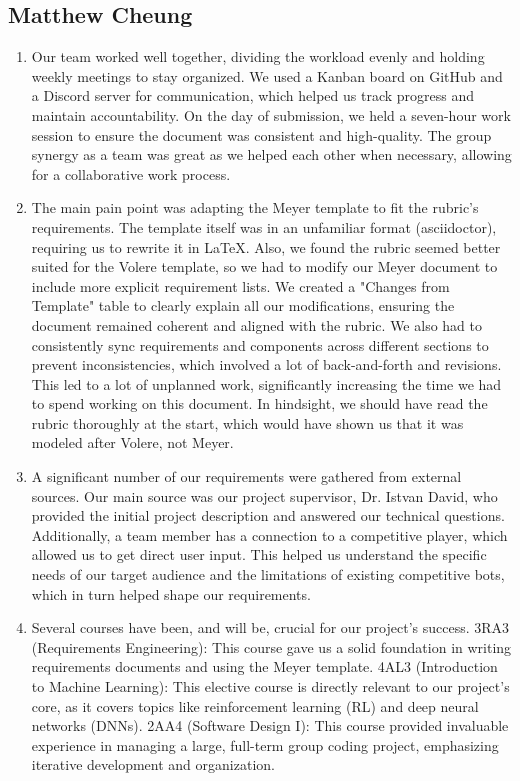 \documentclass{article}
\begin{document}
\subsection*{Matthew Cheung}\label{subsec:matthew-cheung}
\begin{enumerate}
    \item
    Our team worked well together, dividing the workload evenly and holding weekly meetings to stay organized.
    We used a Kanban board on GitHub and a Discord server for communication, which helped us track progress and maintain accountability.
    On the day of submission, we held a seven-hour work session to ensure the document was consistent and high-quality.
    The group synergy as a team was great as we helped each other when necessary, allowing for a collaborative work process.

    \item The main pain point was adapting the Meyer template to fit the rubric's requirements.
    The template itself was in an unfamiliar format (asciidoctor), requiring us to rewrite it in LaTeX.
    Also, we found the rubric seemed better suited for the Volere template, so we had to modify our Meyer document to include more explicit requirement lists.
    We created a "Changes from Template" table to clearly explain all our modifications, ensuring the document remained coherent and aligned with the rubric.
    We also had to consistently sync requirements and components across different sections to prevent inconsistencies, which involved a lot of back-and-forth and revisions.
    This led to a lot of unplanned work, significantly increasing the time we had to spend working on this document.
    In hindsight, we should have read the rubric thoroughly at the start, which would have shown us that it was modeled after Volere, not Meyer.

    \item A significant number of our requirements were gathered from external sources.
    Our main source was our project supervisor, Dr. Istvan David, who provided the initial project description and answered our technical questions.
    Additionally, a team member has a connection to a competitive \emph{\Catan{}} player, which allowed us to get direct user input.
    This helped us understand the specific needs of our target audience and the limitations of existing competitive \AI{} bots, which in turn helped shape our requirements.

    \item Several courses have been, and will be, crucial for our project's success.
    3RA3 (Requirements Engineering): This course gave us a solid foundation in writing requirements documents and using the Meyer template.
    4AL3 (Introduction to Machine Learning): This elective course is directly relevant to our project's core, as it covers topics like reinforcement learning (RL) and deep neural networks (DNNs).
    2AA4 (Software Design I): This course provided invaluable experience in managing a large, full-term group coding project, emphasizing iterative development and organization.


\end{enumerate}
\end{document}
